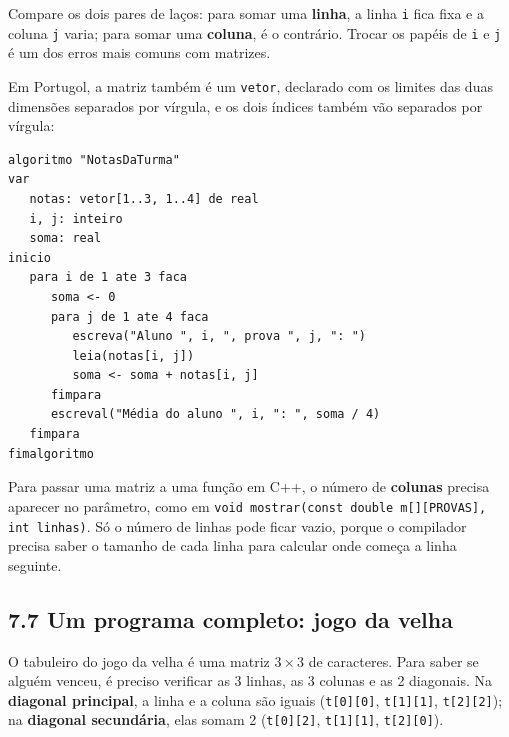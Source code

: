 Compare os dois pares de laços: para somar uma \textbf{linha}, a linha \texttt{i} fica fixa e a coluna \texttt{j} varia; para somar uma \textbf{coluna}, é o contrário. Trocar os papéis de \texttt{i} e \texttt{j} é um dos erros mais comuns com matrizes.

Em Portugol, a matriz também é um \texttt{vetor}, declarado com os limites das duas dimensões separados por vírgula, e os dois índices também vão separados por vírgula:

\begin{codigo}
\begin{Verbatim}[breaklines=true, breaksymbolleft={}, fontsize=\footnotesize]
algoritmo "NotasDaTurma"
var
   notas: vetor[1..3, 1..4] de real
   i, j: inteiro
   soma: real
inicio
   para i de 1 ate 3 faca
      soma <- 0
      para j de 1 ate 4 faca
         escreva("Aluno ", i, ", prova ", j, ": ")
         leia(notas[i, j])
         soma <- soma + notas[i, j]
      fimpara
      escreval("Média do aluno ", i, ": ", soma / 4)
   fimpara
fimalgoritmo
\end{Verbatim}
\end{codigo}

Para passar uma matriz a uma função em C++, o número de \textbf{colunas} precisa aparecer no parâmetro, como em \texttt{void mostrar(const double m[][PROVAS], int linhas)}. Só o número de linhas pode ficar vazio, porque o compilador precisa saber o tamanho de cada linha para calcular onde começa a linha seguinte.

\subsection{7.7 Um programa completo: jogo da velha}

O tabuleiro do jogo da velha é uma matriz $3 \times 3$ de caracteres. Para saber se alguém venceu, é preciso verificar as 3 linhas, as 3 colunas e as 2 diagonais. Na \textbf{diagonal principal}, a linha e a coluna são iguais (\texttt{t[0][0]}, \texttt{t[1][1]}, \texttt{t[2][2]}); na \textbf{diagonal secundária}, elas somam 2 (\texttt{t[0][2]}, \texttt{t[1][1]}, \texttt{t[2][0]}).


